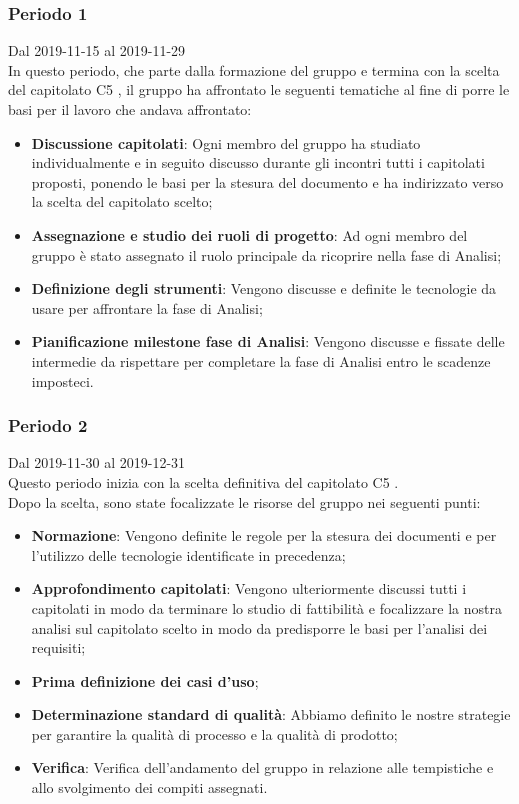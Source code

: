 \subsubsection{Periodo 1} 
Dal 2019-11-15 al 2019-11-29\\
In questo periodo, che parte dalla formazione del gruppo e termina con la scelta del capitolato C5 \NomeProgetto{}, il gruppo ha affrontato le seguenti tematiche al fine di porre le basi per il lavoro che andava affrontato:
\begin{itemize}
	\item \textbf{Discussione capitolati}: Ogni membro del gruppo ha studiato individualmente e in seguito discusso durante gli incontri tutti i capitolati proposti, ponendo le basi per la stesura del documento \SdF{} e ha indirizzato verso la scelta del capitolato scelto;
	\item \textbf{Assegnazione e studio dei ruoli di progetto}: Ad ogni membro del gruppo è stato assegnato il ruolo principale da ricoprire nella fase di Analisi;
	\item \textbf{Definizione degli strumenti}: Vengono discusse e definite le tecnologie da usare per affrontare la fase di Analisi;
	\item \textbf{Pianificazione milestone fase di Analisi}: Vengono discusse e fissate delle  intermedie da rispettare per completare la fase di Analisi entro le scadenze imposteci.
\end{itemize}

\subsubsection{Periodo 2} 
Dal 2019-11-30 al 2019-12-31\\
Questo periodo inizia con la scelta definitiva del capitolato C5 \NomeProgetto{}.\\
Dopo la scelta, sono state focalizzate le risorse del gruppo nei seguenti punti:
\begin{itemize}
	\item \textbf{Normazione}: Vengono definite le regole per la stesura dei documenti e per l'utilizzo delle tecnologie identificate in precedenza;
	\item \textbf{Approfondimento capitolati}: Vengono ulteriormente discussi tutti i capitolati in modo da terminare lo studio di fattibilità e focalizzare la nostra analisi sul capitolato scelto in modo da predisporre le basi per l'analisi dei requisiti;
	\item \textbf{Prima definizione dei casi d'uso};
	\item \textbf{Determinazione standard di qualità}: Abbiamo definito le nostre strategie per garantire la qualità di processo e la qualità di prodotto;
	\item \textbf{Verifica}: Verifica dell'andamento del gruppo in relazione alle tempistiche e allo svolgimento dei compiti assegnati.
\end{itemize}

